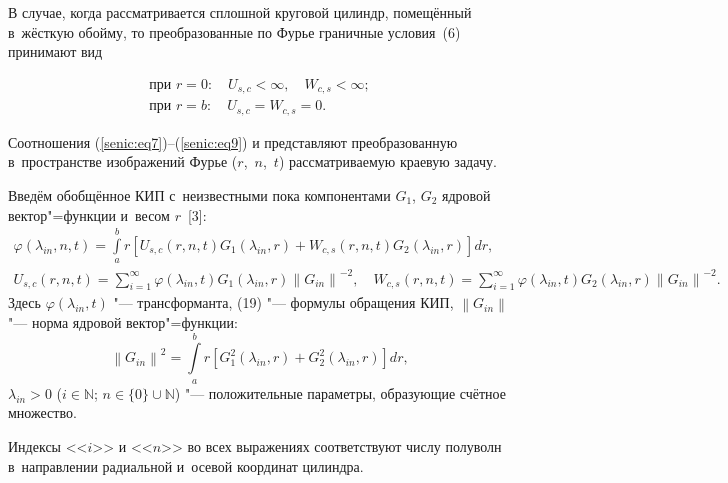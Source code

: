\begin{remark}[2]В случае, когда рассматривается сплошной круговой цилиндр, помещённый в~жёсткую обойму, то преобразованные по Фурье граничные условия~(6) принимают 
вид

\begin{equation}
 \begin{array}{l}
\displaystyle
\text{при } r = 0:\quad  U_{s,c} < \infty,\quad W_{c,s} < \infty;
\\\displaystyle
\text{при } r = b:\quad  U_{s,c} = W_{c,s} = 0.
\end{array}
\end{equation} 
\end{remark}

Соотношения (\ref{senic:eq7})--(\ref{senic:eq9}) и представляют преобразованную в~пространстве 
изображений Фурье \mbox{($r$, $n$, $t$)} рассматриваемую краевую задачу.

Введём обобщённое КИП с~неизвестными пока компонентами $G_1$, $G_2$ 
ядровой вектор"=функции и~весом $r$~[3]:
\begin{gather}
\label{senic:eq11}
\varphi \left( {\lambda _{in} ,n,t} \right) = \int\limits_a^b r \left[ 
{U_{s,c} \left( {r,n,t} \right)G_1 \left( {\lambda _{in} ,r} \right) + 
W_{c,s} \left( {r,n,t} \right)G_2 \left( {\lambda _{in} ,r} \right)} 
\right]dr,\\
U_{s,c} \left( {r,n,t} \right) = \sum\limits_{i = 1}^\infty {\varphi \left( 
{\lambda _{in} ,t} \right)} G_1 \left( {\lambda _{in} ,r} \right)\left\| 
{G_{in} } \right\|^{ - 2},\quad
W_{c,s} \left( {r,n,t} \right) = \sum\limits_{i = 1}^\infty \varphi \left( {\lambda _{in} ,t} \right)G{ 
}_2\left( {\lambda _{in} ,r} \right)\left\| {G_{in} } \right\|^{ - 2}.
\end{gather}
Здесь $\varphi \left( {\lambda _{in} ,t} \right)  $ "--- трансформанта, (19) "--- формулы обращения КИП, $\left\| {G_{in} } \right\| $ "--- норма ядровой вектор"=функции:
\begin{equation}
\label{senic:eq12}
\left\| {G_{in} } \right\|^2 = \int\limits_a^b {r\left[ {G_1^2 \left( 
{\lambda _{in} ,r} \right) + G_2^2 \left( {\lambda _{in} ,r} \right)} 
\right]} dr,
\end{equation}
$\lambda _{in} > 0$ ($ i \in \mathbb N$; $n \in \{0\}\cup \mathbb N$) "--- 
положительные параметры, образующие счётное множество.

Индексы <<$i$>> и <<$n$>> во всех выражениях соответствуют числу полуволн в~направлении радиальной и~осевой координат цилиндра. 


